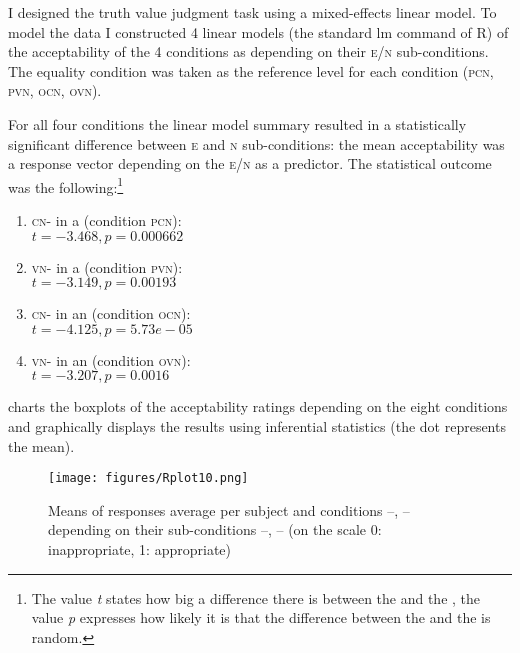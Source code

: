 \documentclass[output=paper, colorlinks, citecolor=brown, newtxmath]{langsci/langscibook}
\begin{document}
I designed the truth value judgment task using a mixed-effects linear model. To model the data I constructed 4 linear models (the standard lm command of R) of the acceptability of the 4 conditions as depending on their \textsc{e/n} sub-conditions. The equality condition was taken as the reference level for each condition (\textsc{pcn, pvn, ocn, ovn}).

For all four conditions the linear model summary resulted in a statistically significant difference between \textsc{e} and \textsc{n} sub-conditions: the mean acceptability was a response vector depending on the \textsc{e/n} as a predictor. The statistical outcome was the following:\footnote{The value \textit{t} states how big a difference there is between the  and the , the value \textit{p} expresses how likely it is that the difference between the  and the  is random.}

\begin{enumerate}
\item \textsc{cn-} in a  (condition \textsc{pcn}):\\$t=-3.468,p=0.000662$
\item \textsc{vn-} in a  (condition \textsc{pvn}):\\$t=-3.149,p= 0.00193$
\item \textsc{cn-} in an  (condition \textsc{ocn}):\\$t=-4.125,p=5.73e-05$
\item \textsc{vn-} in an  (condition \textsc{ovn}):\\$t=-3.207,p=0.0016$
\end{enumerate}

\noindent {} charts the boxplots of the acceptability ratings depending on the eight conditions and graphically displays the results using inferential statistics (the dot represents the mean).

\begin{figure}[t]
\texttt{[image: figures/Rplot10.png]}
\centering
\caption{Means of responses average per subject and conditions --, -- depending on their sub-conditions --, -- (on the scale 0: inappropriate, 1: appropriate)}
\label{fig:graf}
\end{figure}
\end{document}
